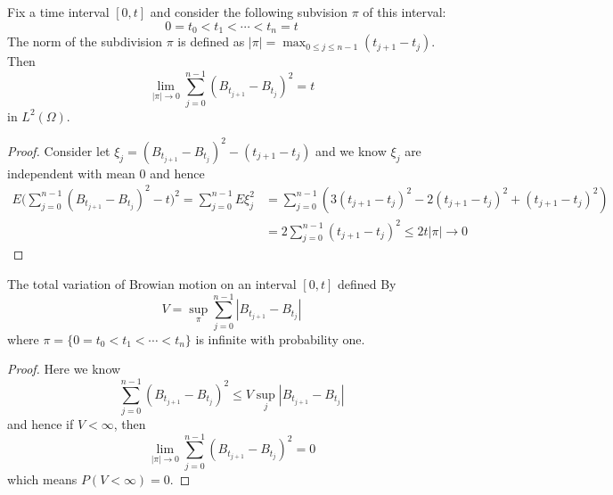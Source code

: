 \documentclass[lang=en, color=blue, ]{elegantbook}
\begin{document}
\begin{proposition}
    Fix a time interval $[0,t]$ and consider the following subvision $\pi$ of this interval:
    \[0 = t_0 < t_1 < \cdots<t_n = t\]
    The norm of the subdivision $\pi$ is defined as $|\pi| = \max_{0\leq j \leq n-1}(t_{j+1}-t_j)$. Then
    \[\lim_{|\pi|\to 0} \sum\limits_{j=0}^{n-1}(B_{t_{j+1}}-B_{t_j})^2 = t\]
    in $L^2(\Omega)$.
\end{proposition}  
\begin{proof}\par
    Consider let $\xi_j =(B_{t_{j+1}}-B_{t_j})^2 - (t_{j+1}-t_j)$ and we know $\xi_j$ are independent with mean $0$ and hence
    \[
    \begin{aligned}
    E\Big(\sum\limits_{j=0}^{n-1}(B_{t_{j+1}}-B_{t_j})^2-t\Big)^2 = \sum\limits_{j=0}^{n-1}E\xi_j^2 &= \sum\limits_{j=0}^{n-1}(3(t_{j+1}-t_j)^2 - 2(t_{j+1}-t_j)^2+(t_{j+1}-t_j)^2) \\ &= 2\sum\limits_{j=0}^{n-1}(t_{j+1}-t_j)^2 \leq 2t|\pi| \to 0
    \end{aligned}
    \]
\end{proof}

\begin{proposition}
    The total variation of Browian motion on an interval $[0,t]$ defined By
    \[V = \sup_{\pi}\sum\limits_{j=0}^{n-1}|B_{t_{j+1}}- B_{t_j}|\]
    where $\pi = \{0 = t_0<t_1<\cdots<t_n\}$ is infinite with probability one.
\end{proposition}
\begin{proof}\par
    Here we know
    \[
    \sum\limits_{j=0}^{n-1}(B_{t_{j+1}}-B_{t_j})^2 \leq V\sup_{j}|B_{t_{j+1}}-B_{t_j}|
    \]
    and hence if $V<\infty$, then
    \[
    \lim_{|\pi|\to 0}\sum\limits_{j=0}^{n-1}(B_{t_{j+1}}-B_{t_j})^2 = 0
    \]
    which means $P(V<\infty) = 0$.
\end{proof}
\end{document}
